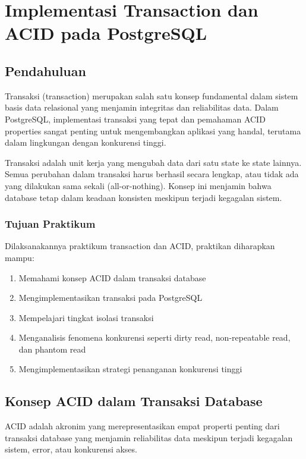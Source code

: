 \chapter{Implementasi Transaction dan ACID pada PostgreSQL}
\setcounter{section}{0}
\section{Pendahuluan}
Transaksi (transaction) merupakan salah satu konsep fundamental dalam sistem basis data relasional yang menjamin integritas dan reliabilitas data. Dalam PostgreSQL, implementasi transaksi yang tepat dan pemahaman ACID properties sangat penting untuk mengembangkan aplikasi yang handal, terutama dalam lingkungan dengan konkurensi tinggi.

Transaksi adalah unit kerja yang mengubah data dari satu state ke state lainnya. Semua perubahan dalam transaksi harus berhasil secara lengkap, atau tidak ada yang dilakukan sama sekali (all-or-nothing). Konsep ini menjamin bahwa database tetap dalam keadaan konsisten meskipun terjadi kegagalan sistem.

\subsection{Tujuan Praktikum}
Dilaksanakannya praktikum transaction dan ACID, praktikan diharapkan mampu:
\begin{enumerate}
    \item Memahami konsep ACID dalam transaksi database
    \item Mengimplementasikan transaksi pada PostgreSQL
    \item Mempelajari tingkat isolasi transaksi
    \item Menganalisis fenomena konkurensi seperti dirty read, non-repeatable read, dan phantom read
    \item Mengimplementasikan strategi penanganan konkurensi tinggi
\end{enumerate}

\section{Konsep ACID dalam Transaksi Database}

ACID adalah akronim yang merepresentasikan empat properti penting dari transaksi database yang menjamin reliabilitas data meskipun terjadi kegagalan sistem, error, atau konkurensi akses.

